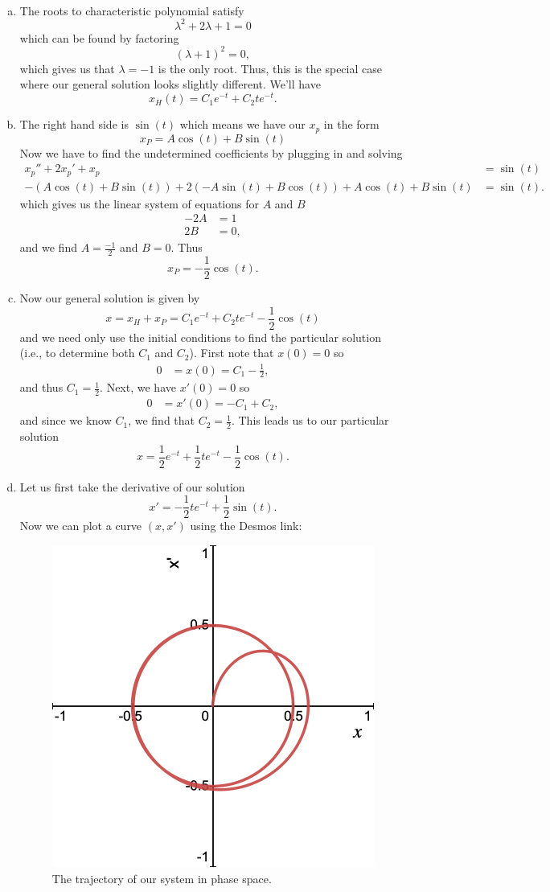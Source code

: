 \documentclass[12pt]{article} %
\begin{document}
\begin{solution}~
\begin{enumerate}[(a)]
    \item The roots to characteristic polynomial satisfy
    \[
    \lambda^2 + 2\lambda + 1 = 0
    \]
    which can be found by factoring
    \[
    (\lambda+1)^2=0,
    \]
    which gives us that $\lambda=-1$ is the only root.  Thus, this is the special case where our general solution looks slightly different.  We'll have
    \[
    \boxed{x_H(t)=C_1e^{-t}+C_2te^{-t}.}
    \]
    \item The right hand side is $\sin(t)$ which means we have our $x_p$ in the form 
    \[
    x_P = A\cos(t)+B\sin(t)
    \]
    Now we have to find the undetermined coefficients by plugging in and solving
    \begin{align*}
        x_p''+2x_p'+x_p&=\sin(t)\\
    	-(A\cos(t)+B\sin(t))+2(-A\sin(t)+B\cos(t))+A\cos(t)+B\sin(t) &= \sin(t).
    \end{align*}
    which gives us the linear system of equations for $A$ and $B$
    \begin{align*}
    	-2A&=1\\
    	2B&=0,
    \end{align*}
    and we find $A=\frac{-1}{2}$ and $B=0$. Thus
    \[
    \boxed{x_P=-\frac{1}{2}\cos(t).}
    \]
    \item Now our general solution is given by 
    \[
    x=x_H+x_P=C_1 e^{-t}+C_2 te^{-t}-\frac{1}{2}\cos(t)
    \]
    and we need only use the initial conditions to find the particular solution (i.e., to determine both $C_1$ and $C_2$). First note that $x(0)=0$ so
	\begin{align*}
		0&=x(0)=C_1-\frac{1}{2},
	\end{align*}
	and thus $C_1=\frac{1}{2}$. Next, we have $x'(0)=0$ so
    \begin{align*}
    	0&=x'(0)=-C_1+C_2,
    \end{align*}
    and since we know $C_1$, we find that $C_2=\frac{1}{2}$. This leads us to our particular solution
    \[
    \boxed{x=\frac{1}{2}e^{-t}+\frac{1}{2}te^{-t}-\frac{1}{2}\cos(t).}
    \]
    \item Let us first take the derivative of our solution
    \[
    x'= -\frac{1}{2}te^{-t}+\frac{1}{2}\sin(t).
    \]
    Now we can plot a curve $(x,x')$ using the Desmos link:
    \begin{figure}[H]
    	\centering
    	\includegraphics[width=.4\textwidth]{stable_periodic.png}
    	\caption{The trajectory of our system in phase space.}
    \end{figure}
    

\end{enumerate}
\end{solution}
\end{document}
